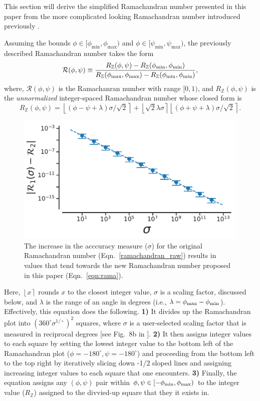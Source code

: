 \documentclass[fleqn,10pt,lineno]{wlpeerj} %
\newcommand{\round}[1]{\left \lfloor #1 \right \rceil }
\newcommand{\Eqn}[1]{Eqn.~\ref{#1}}
\begin{document}
This section will derive the simplified Ramachandran number presented in this paper from the more complicated looking Ramachandran number introduced previously \citep{Mannige2016}. 

Assuming the bounds $\phi \in [\phi_\textrm{min},\phi_\textrm{max})$ and  $\phi \in [\psi_\textrm{min},\psi_\textrm{max})$, the previously described Ramachandran number takes the form 
\begin{equation}
{\mathcal{R}}(\phi,\psi) \equiv  \frac{R_\mathbb{Z}(\phi,\psi)-R_{\mathbb{Z}}(\phi_{\rm{min}},\phi_{\rm{min}})}
{R_{\mathbb{Z}}(\phi_{\rm{max}},\phi_{\rm{max}})-R_{\mathbb{Z}}(\phi_{\rm{min}},\phi_{\rm{min}})},\label{rama}
\end{equation}
where, $\mathcal{R}(\phi,\psi)$ is the Ramachanran number with range $[0,1)$, and $R_\mathbb{Z}(\phi,\psi)$ is the {\it unnormalized} integer-spaced Ramachandran number whose closed form is
\begin{equation}
R_\mathbb{Z}(\phi,\psi)  = \round{(\phi - \psi + \lambda)\sigma/\sqrt{2}}  + \round{\sqrt{2} \lambda\sigma} \round{(\phi+\psi + \lambda)\sigma/\sqrt{2}}.\label{ramachandran_raw}
\end{equation}

\begin{figure}[b!]
\centering
\includegraphics[width=0.6\linewidth]{backmap_fig13.pdf}
\caption{The increase in the acccuracy measure ($\sigma$) for the original Ramachandran number (\Eqn{ramachandran_raw}) results in values that tend towards the new Ramachandran number proposed in this paper (\Eqn{eqn:rama}).\label{fig:sigma}} 
\end{figure} 

Here, $\round{x}$ rounds $x$ to the closest integer value, $\sigma$ is a scaling factor, discussed below, and $\lambda$ is the range of an angle in degrees (i.e., $\lambda=\phi_{\rm max}-\phi_{\rm min}$). Effectively, this equation does the following. \textbf{1)} It divides up the Ramachandran plot into $(360^\circ \sigma^{1/\circ})^2$  squares, where $\sigma$ is a user-selected scaling factor that is measured in reciprocal degrees [see Fig.~8b in \cite{Mannige2016}]. \textbf{2)} It then assigns integer values to each square by setting the lowest integer value to the bottom left of the Ramachandran plot ($\phi=-180^\circ,\psi=-180^\circ$) and proceeding from the bottom left to the top right by iteratively slicing down -1/2 sloped lines and assigning increasing integer values to each square that one encounters. \textbf{3)} Finally, the equation assigns any $(\phi,\psi)$ pair within $\phi,\psi \in [-\phi_{\rm min},\phi_{\rm max})$ to the integer value ($R_\mathbb{Z}$) assigned to the divvied-up square that they it exists in.
\end{document}
